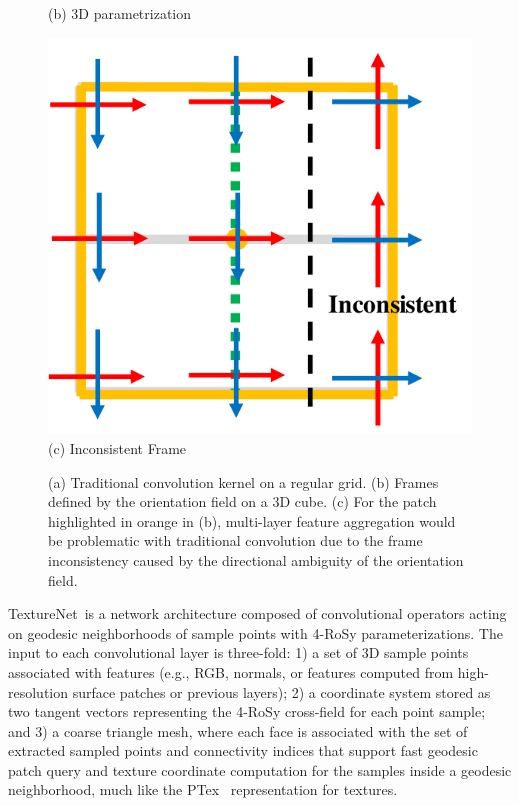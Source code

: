 \begin{figure}
\begin{minipage}{0.32\linewidth}
     \footnotesize{
     (b) 3D parametrization
     }
     \end{minipage}
     \begin{minipage}{0.32\linewidth}
     \centering
     \includegraphics[width=\linewidth,height=\linewidth]{texturenet/diagram/conv_coordinate.pdf}\\
     \footnotesize{
     (c) Inconsistent Frame
     }
     \end{minipage}
     \caption{(a) Traditional convolution kernel on a regular grid. (b) Frames defined by the orientation field on a 3D cube. (c) For the patch highlighted in orange in (b), multi-layer feature aggregation would be problematic with traditional convolution due to the frame inconsistency caused by the directional ambiguity of the orientation field.}
     \label{fig:texturenet-singular}
 \end{figure}

TextureNet~is a network architecture composed of convolutional operators acting on geodesic neighborhoods of sample points with 4-RoSy parameterizations.
The input to each convolutional layer is three-fold: 1) a set of 3D sample points associated with features (e.g., RGB, normals, or features computed from high-resolution surface patches or previous layers); 2) a coordinate system stored as two tangent vectors representing the 4-RoSy cross-field for each point sample; and 3) a coarse triangle mesh, where each face is associated with the set of extracted sampled points and connectivity indices that support fast geodesic patch query and texture coordinate computation for the samples inside a geodesic neighborhood, much like the PTex~\cite{burley2008ptex} representation for textures. 

